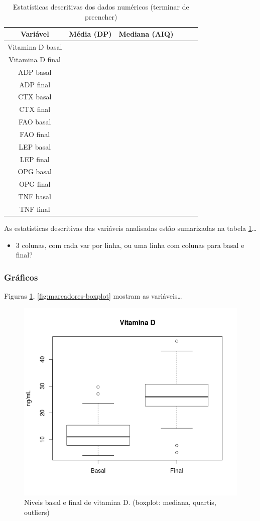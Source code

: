 \documentclass[a4paper]{article}
\begin{document}
\begin{table}[!h]
  \centering
  \begin{tabular}{c|ccccc}
    \hline
    Variável& Média (DP) &Mediana (AIQ)&&&\\
    \hline
    \hline
    Vitamina D basal&&&&&\\
    Vitamina D final&&&&&\\
    \hline
    ADP basal &&&&&\\
    ADP final&&&&&\\
    CTX basal &&&&&\\
    CTX final&&&&&\\
    FAO basal &&&&&\\
    FAO final&&&&&\\
    LEP basal &&&&&\\
    LEP final&&&&&\\
    OPG basal &&&&&\\
    OPG final&&&&&\\
    TNF basal &&&&&\\
    TNF final&&&&&\\
    \hline
  \end{tabular}
  \caption[Estatísticas descritivas dos dados numéricos]{Estatísticas descritivas dos dados numéricos (terminar de preencher)}
  \label{tab:descritivas}
\end{table}

As estatísticas descritivas das variáveis analisadas estão sumarizadas na tabela \ref{tab:descritivas}\ldots

\begin{itemize}
\item 3 colunas, com cada var por linha, ou uma linha com colunas para basal e final?
\end{itemize}

\subsubsection{Gráficos}

Figuras \ref{fig:vitd-boxplot}, \ref{fig:marcadores-boxplot} mostram as variáveis\ldots

\begin{figure}[!h]
  \centering
  \includegraphics[width=.5\textwidth]{../figuras/vitaminad}
  \caption[Níveis basal e final de vitamina D]{Níveis basal e final de vitamina D. (boxplot: mediana, quartis, outliers)}
  \label{fig:vitd-boxplot}
\end{figure}
\end{document}
